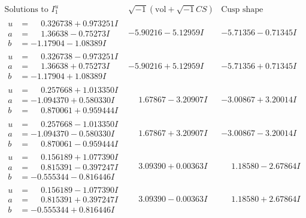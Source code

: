 \documentclass[1p]{elsarticle_modified}
\theoremstyle{definition}
\newcommand{\I}{\sqrt{-1}}
\begin{document}
$$\begin{array}{c|c|c}  
\text{Solutions to }I^u_{1}& \I (\text{vol} + \sqrt{-1}CS) & \text{Cusp shape}\\
 \hline 
\begin{aligned}
u &= \phantom{-}0.326738 + 0.973251 I \\
a &= \phantom{-}1.36638 - 0.75273 I \\
b &= -1.17904 - 1.08389 I\end{aligned}
 & -5.90216 - 5.12959 I & -5.71356 - 0.71345 I \\ \hline\begin{aligned}
u &= \phantom{-}0.326738 - 0.973251 I \\
a &= \phantom{-}1.36638 + 0.75273 I \\
b &= -1.17904 + 1.08389 I\end{aligned}
 & -5.90216 + 5.12959 I & -5.71356 + 0.71345 I \\ \hline\begin{aligned}
u &= \phantom{-}0.257668 + 1.013350 I \\
a &= -1.094370 + 0.580330 I \\
b &= \phantom{-}0.870061 + 0.959444 I\end{aligned}
 & \phantom{-}1.67867 - 3.20907 I & -3.00867 + 3.20014 I \\ \hline\begin{aligned}
u &= \phantom{-}0.257668 - 1.013350 I \\
a &= -1.094370 - 0.580330 I \\
b &= \phantom{-}0.870061 - 0.959444 I\end{aligned}
 & \phantom{-}1.67867 + 3.20907 I & -3.00867 - 3.20014 I \\ \hline\begin{aligned}
u &= \phantom{-}0.156189 + 1.077390 I \\
a &= \phantom{-}0.815391 - 0.397247 I \\
b &= -0.555344 - 0.816446 I\end{aligned}
 & \phantom{-}3.09390 + 0.00363 I & \phantom{-}1.18580 - 2.67864 I \\ \hline\begin{aligned}
u &= \phantom{-}0.156189 - 1.077390 I \\
a &= \phantom{-}0.815391 + 0.397247 I \\
b &= -0.555344 + 0.816446 I\end{aligned}
 & \phantom{-}3.09390 - 0.00363 I & \phantom{-}1.18580 + 2.67864 I \\ \hline\begin{aligned}

\end{aligned}
\end{array}$$
\end{document}
